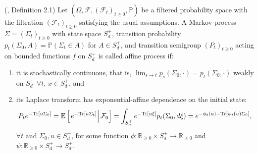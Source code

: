 \begin{definition}
(\cite{article_Cuchiero}, Definition 2.1) Let $(\Omega, \mathcal{F} ,\left(\mathcal{F}_t \right)_{t \geq 0}, \mathbb{P})$ be a filtered probability space with the filtration $\left(\mathcal{F}_t \right)_{t \geq 0}$ satisfying the usual assumptions. A Markov process $\Sigma=\left(\Sigma_{t} \right)_{t \geq 0}$ with state space $S_{d}^{+}$, transition probability $p_{t}(\Sigma_0,A)=\mathbb{P}(\Sigma_{t} \in A)$ for $A \in S_{d}^{+}$, and transition semigroup $\left( P_{t}\right)_{t \geq 0}$ acting on bounded functions $f$ on $S_{d}^{+}$ is called affine process if:
\begin{enumerate}
\item it is stochastically continuous, that is, $\lim_{s \to t}p_{s}(\Sigma_0, \cdot)=p_{t}(\Sigma_0, \cdot)$ weakly on $S_{d}^{+}$ $\forall t \text{, } x \in S_{d}^{+}$, and
\item its Laplace transform has exponential-affine dependence on the initial state:
\begin{equation}
P_{t}e^{-\textup{Tr}\left[u\Sigma_0 \right]}=\mathbb{E}\left[\left.e^{-\textup{Tr}\left[u\Sigma_t\right]}\right|\mathcal{F}_0\right]=\int_{S_{d}^{+}}{e^{-\textup{Tr}\left[u\xi \right]}p_t(\Sigma_0,d\xi)}=e^{-\phi_t(u)-\textup{Tr}\left[ \psi_t(u)\Sigma_0\right]},
\label{LaplaceAffine}\end{equation}
$\forall t\text{ and } \Sigma_{0}, u \in S_{d}^{+}$, for some function $\phi: \mathbb{R}_{\geq 0}\times S_{d}^{+} \rightarrow \mathbb{R}_{\geq 0}$ and $\psi: \mathbb{R}_{\geq 0}\times S_{d}^{+} \rightarrow S_{d}^{+}$.
\end{enumerate}
\label{definition1}\end{definition}
%
%
%
%
%

